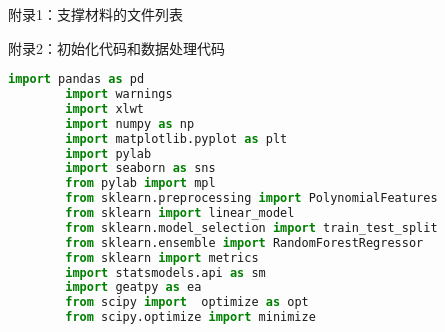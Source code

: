 \documentclass[a4paper]{article}
\begin{document}
	附录1：支撑材料的文件列表
 
	
	附录2：初始化代码和数据处理代码
	\begin{lstlisting}[language=python,columns=fullflexible,frame=shadowbox]
		import pandas as pd
		import warnings
		import xlwt
		import numpy as np
		import matplotlib.pyplot as plt
		import pylab
		import seaborn as sns
		from pylab import mpl
		from sklearn.preprocessing import PolynomialFeatures
		from sklearn import linear_model
		from sklearn.model_selection import train_test_split
		from sklearn.ensemble import RandomForestRegressor
		from sklearn import metrics
		import statsmodels.api as sm
		import geatpy as ea
		from scipy import  optimize as opt
		from scipy.optimize import minimize
	\end{lstlisting}
	
\end{document}
